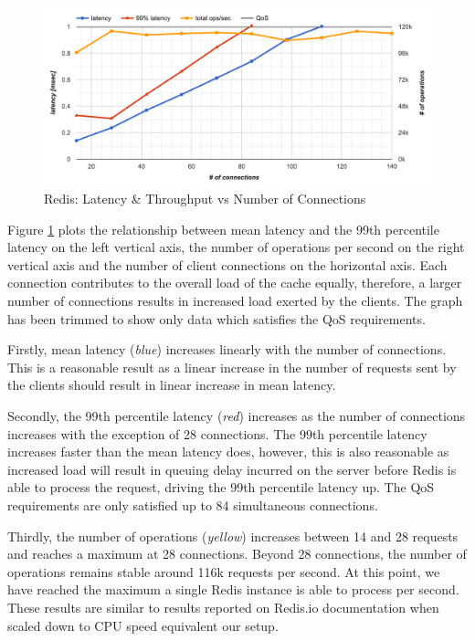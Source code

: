 \begin{figure}[h]
    \includegraphics[width=\textwidth]{./res2/r_baseline_latency.png}
    \caption{Redis: Latency \& Throughput vs Number of Connections}
    \label{fig:r_baseline_latency.png}
\end{figure}

Figure \ref{fig:r_baseline_latency.png} plots the relationship between mean latency and the 99th percentile latency on the left vertical axis, the number of operations per second on the right vertical axis and the number of client connections on the horizontal axis. Each connection contributes to the overall load of the cache equally, therefore, a larger number of connections results in increased load exerted by the clients. The graph has been trimmed to show only data which satisfies the QoS requirements.

Firstly, mean latency (\textit{blue}) increases linearly with the number of connections. This is a reasonable result as a linear increase in the number of requests sent by the clients should result in linear increase in mean latency.

Secondly, the 99th percentile latency (\textit{red}) increases as the number of connections increases with the exception of 28 connections. The 99th percentile latency increases faster than the mean latency does, however, this is also reasonable as increased load will result in queuing delay incurred on the server before Redis is able to process the request, driving the 99th percentile latency up. The QoS requirements are only satisfied up to 84 simultaneous connections.

Thirdly, the number of operations (\textit{yellow}) increases between 14 and 28 requests and reaches a maximum at 28 connections. Beyond 28 connections, the number of operations remains stable around 116k requests per second. At this point, we have reached the maximum a single Redis instance is able to process per second. These results are similar to results reported on Redis.io documentation \cite{redis-benchmarks} when scaled down to CPU speed equivalent our setup.

